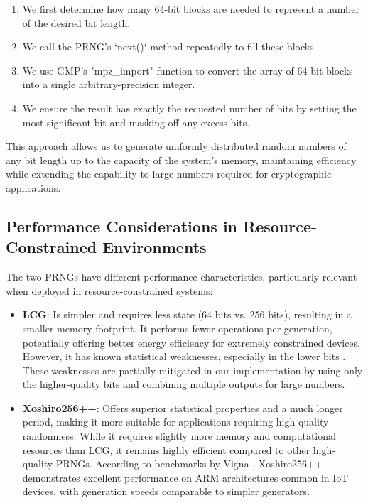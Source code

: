 \begin{enumerate}
    \item We first determine how many 64-bit blocks are needed to represent a number of the desired bit length.
    
    \item We call the PRNG's `next()` method repeatedly to fill these blocks.
    
    \item We use GMP's "mpz\_import" function to convert the array of 64-bit blocks into a single arbitrary-precision integer.
    
    \item We ensure the result has exactly the requested number of bits by setting the most significant bit and masking off any excess bits.
\end{enumerate}

This approach allows us to generate uniformly distributed random numbers of any bit length up to the capacity of the system's memory, maintaining efficiency while extending the capability to large numbers required for cryptographic applications.

\subsection{Performance Considerations in Resource-Constrained Environments}

The two PRNGs have different performance characteristics, particularly relevant when deployed in resource-constrained systems:

\begin{itemize}
    \item \textbf{LCG}: Is simpler and requires less state (64 bits vs. 256 bits), resulting in a smaller memory footprint. It performs fewer operations per generation, potentially offering better energy efficiency for extremely constrained devices. However, it has known statistical weaknesses, especially in the lower bits \cite{knuth1997}. These weaknesses are partially mitigated in our implementation by using only the higher-quality bits and combining multiple outputs for large numbers.
    
    \item \textbf{Xoshiro256++}: Offers superior statistical properties and a much longer period, making it more suitable for applications requiring high-quality randomness. While it requires slightly more memory and computational resources than LCG, it remains highly efficient compared to other high-quality PRNGs. According to benchmarks by Vigna \cite{xoshiro_website}, Xoshiro256++ demonstrates excellent performance on ARM architectures common in IoT devices, with generation speeds comparable to simpler generators.
\end{itemize}

